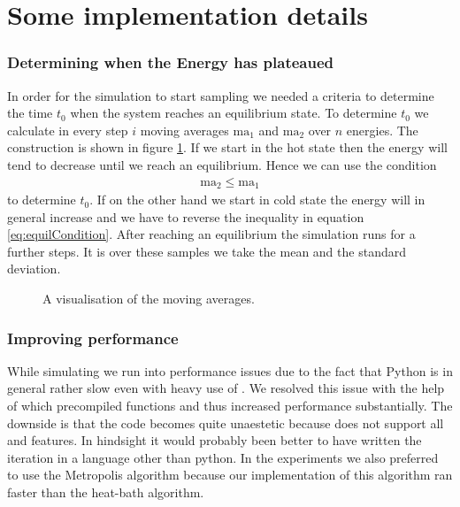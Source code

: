 \section{Some implementation details}

\subsubsection{Determining when the Energy has plateaued}

In order for the simulation to start sampling we needed a criteria to determine the time $t_0$ when the system reaches an equilibrium state.
 To determine $t_0$ we calculate in every step $i$ moving averages $\text{ma}_1$ and $\text{ma}_2$ over $n$ energies. The construction is shown in figure \ref{fi:movingAverages}. If we start in the hot state then the energy will tend to decrease until we reach an equilibrium. Hence we can use the condition
\begin{align}
	\text{ma}_2 \leq \text{ma}_1 \label{eq:equilCondition}
\end{align}
to determine $t_0$. If on the other hand we start in cold state the energy will in general increase and we have to reverse the inequality in equation \eqref{eq:equilCondition}. After reaching an equilibrium the simulation runs for a further  steps. It is over these samples we take the mean and the standard deviation.

\begin{figure}
\centering

\caption{A visualisation of the moving averages.}
\label{fi:movingAverages}
\end{figure}

\subsubsection{Improving performance}

While simulating we run into performance issues due to the fact that Python is in general rather slow even with heavy use of . We resolved this issue with the help of  which precompiled functions and thus increased performance substantially. The downside is that the code becomes quite unaestetic because  does not support all  and  features. In hindsight it would probably been better to have written the iteration in a language other than python.
In the experiments we also preferred to use the Metropolis algorithm because our implementation of this algorithm ran faster than the heat-bath algorithm.

